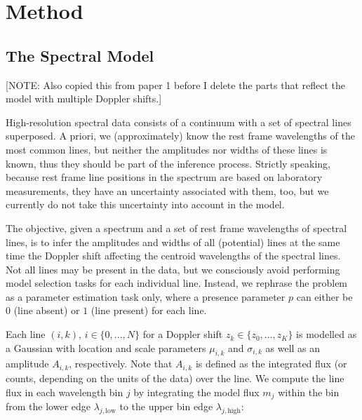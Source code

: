 \documentclass[12pt]{emulateapj}
\newcommand{\mean}{m}
\begin{document}
\section{Method}
\label{sec:method}

\subsection{The Spectral Model}
\label{sec:spectralmodel}

[NOTE: Also copied this from paper 1 before I delete the parts that reflect the model with multiple Doppler shifts.]


High-resolution spectral data consists of a continuum with a set of spectral lines superposed. A priori, we (approximately) know the rest frame wavelengths of the most common lines, but neither the amplitudes nor widths of these lines is known, thus they should be part of the inference process. Strictly speaking, because rest frame line positions in the spectrum are based on laboratory measurements, they have an uncertainty associated with them, too, but we currently do not take this uncertainty into account in the model.

The objective, given a spectrum and a set of rest frame wavelengths of spectral lines, is to infer the amplitudes and widths of all (potential) lines at the same time the Doppler shift affecting the centroid wavelengths of the spectral lines. Not all lines may be present in the data, but we consciously avoid performing model selection tasks for each individual line. Instead, we rephrase the problem as a parameter estimation task only, where a presence parameter $p$ can either be $0$ (line absent) or $1$ (line present) for each line.%

Each line $(i,k), \, i \in \{0, ..., N\}$ for a Doppler shift $z_k \in \{z_0, ..., z_K\}$ is modelled as a Gaussian with location and scale parameters $\mu_{i,k}$ and $\sigma_{i,k}$ as well as an amplitude $A_{i,k}$, respectively. Note that $A_{i,k}$ is defined as the integrated flux (or counts, depending on the units of the data) over the line. We compute the line flux in each wavelength bin $j$ by integrating the model flux $\mean_j$ within the bin from the lower edge $\lambda_{j, \mathrm{low}}$ to the upper bin edge $\lambda_{j, \mathrm{high}}$:
\end{document}
